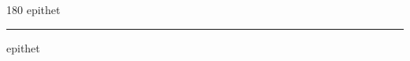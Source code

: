 
\begin{frame}
\begin{center}
\begin{turn}{180}
{\fontsize{2.5cm}{1em}\selectfont epithet}
\end{turn}
\vspace{1em}\par  
\hrule
\vspace{1em}\par  
{\fontsize{2.5cm}{1em}\selectfont epithet}
\end{center}
\end{frame}
